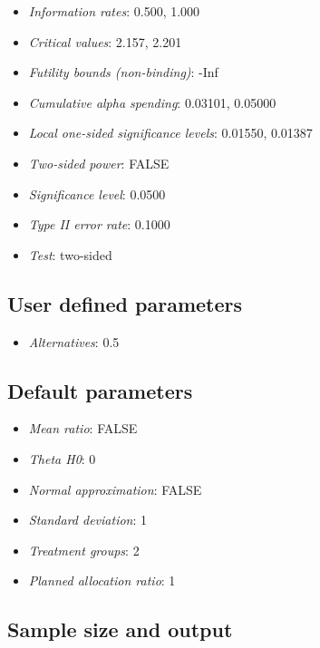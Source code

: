\documentclass[
  letterpaper,
  DIV=11,
  numbers=noendperiod]{scrreprt}
\providecommand{\tightlist}{%
  \setlength{\itemsep}{0pt}\setlength{\parskip}{0pt}}\usepackage{longtable,booktabs,array}
\begin{document}
\begin{itemize}
\tightlist
\item
  \emph{Information rates}: 0.500, 1.000
\item
  \emph{Critical values}: 2.157, 2.201
\item
  \emph{Futility bounds (non-binding)}: -Inf
\item
  \emph{Cumulative alpha spending}: 0.03101, 0.05000
\item
  \emph{Local one-sided significance levels}: 0.01550, 0.01387
\item
  \emph{Two-sided power}: FALSE
\item
  \emph{Significance level}: 0.0500
\item
  \emph{Type II error rate}: 0.1000
\item
  \emph{Test}: two-sided
\end{itemize}

\hypertarget{user-defined-parameters-2}{%
\subsection{User defined parameters}\label{user-defined-parameters-2}}

\begin{itemize}
\tightlist
\item
  \emph{Alternatives}: 0.5
\end{itemize}

\hypertarget{default-parameters-2}{%
\subsection{Default parameters}\label{default-parameters-2}}

\begin{itemize}
\tightlist
\item
  \emph{Mean ratio}: FALSE
\item
  \emph{Theta H0}: 0
\item
  \emph{Normal approximation}: FALSE
\item
  \emph{Standard deviation}: 1
\item
  \emph{Treatment groups}: 2
\item
  \emph{Planned allocation ratio}: 1
\end{itemize}

\hypertarget{sample-size-and-output-1}{%
\subsection{Sample size and output}\label{sample-size-and-output-1}}
\end{document}
